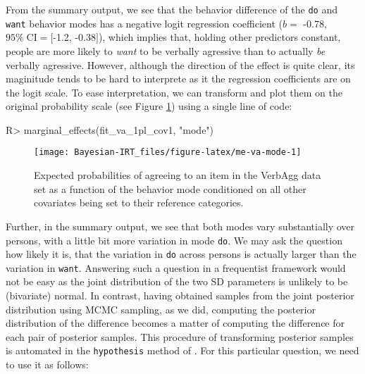 \documentclass[jss]{jss}
\begin{document}
From the summary output, we see that the behavior difference of the
\texttt{do} and \texttt{want} behavior modes has a negative logit
regression coefficient (\(b =\) -0.78, \(95\% \; \text{CI} = [\)-1.2,
-0.38\(]\)), which implies that, holding other predictors constant,
people are more likely to \emph{want} to be verbally agressive than to
actually \emph{be} verbally agressive. However, although the direction
of the effect is quite clear, its maginitude tends to be hard to
interprete as it the regression coefficients are on the logit scale. To
ease interpretation, we can transform and plot them on the original
probability scale (see Figure \ref{fig:me-va-mode}) using a single line
of code:

\begin{CodeChunk}

\begin{CodeInput}
R> marginal_effects(fit_va_1pl_cov1, "mode")
\end{CodeInput}
\begin{figure}

{\centering \texttt{[image: Bayesian-IRT\_files/figure-latex/me-va-mode-1]} 

}

\caption[Expected probabilities of agreeing to an item in the VerbAgg data set as a function of the behavior mode conditioned on all other covariates being set to their reference categories]{Expected probabilities of agreeing to an item in the VerbAgg data set as a function of the behavior mode conditioned on all other covariates being set to their reference categories.}\label{fig:me-va-mode}
\end{figure}
\end{CodeChunk}

Further, in the summary output, we see that both modes vary
substantially over persons, with a little bit more variation in mode
\texttt{do}. We may ask the question how likely it is, that the
variation in \texttt{do} across persons is actually larger than the
variation in \texttt{want}. Answering such a question in a frequentist
framework would not be easy as the joint distribution of the two SD
parameters is unlikely to be (bivariate) normal. In contrast, having
obtained samples from the joint posterior distribution using MCMC
sampling, as we did, computing the posterior distribution of the
difference becomes a matter of computing the difference for each pair of
posterior samples. This procedure of transforming posterior samples is
automated in the \texttt{hypothesis} method of . For this
particular question, we need to use it as follows:
\end{document}
